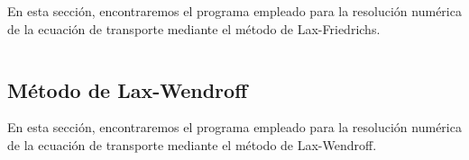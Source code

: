 En esta sección, encontraremos el programa empleado para la
resolución numérica de la ecuación de transporte mediante el método
de Lax-Friedrichs.

\begin{listing}[ht!]
    \footnotesize
    \centering
    \inputminted[firstline=3,lastline=4]{python}{figure1.py}
\end{listing}

\subsection{Método de Lax-Wendroff}

En esta sección, encontraremos el programa empleado para la
resolución numérica de la ecuación de transporte mediante el método
de Lax-Wendroff.

\begin{listing}[ht!]
    \footnotesize
    \centering
    \inputminted[firstline=3,lastline=4]{python}{figure1.py}
\end{listing}